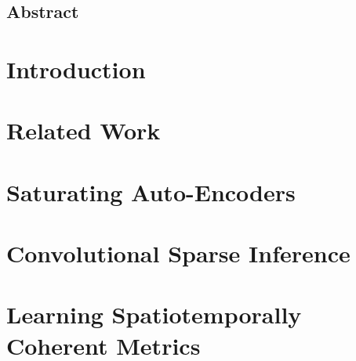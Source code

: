 \documentclass[12pt,letterpaper]{report}
\begin{document}
\section*{Abstract}

\newpage
\tableofcontents
\cleardoublepage
{}
\listoffigures
\newpage

\listoftables{}
\newpage


\chapter{Introduction} 
\label{chapter:introduction} 

\chapter{Related Work}
\label{chapter:related_work}
 
\chapter{Saturating Auto-Encoders}
\label{chapter:SATAE}

\chapter{Convolutional Sparse Inference}
\label{chapter:LISTA} 
 
\chapter{Learning Spatiotemporally Coherent Metrics}
\label{chapter:slow} 

\end{document}
